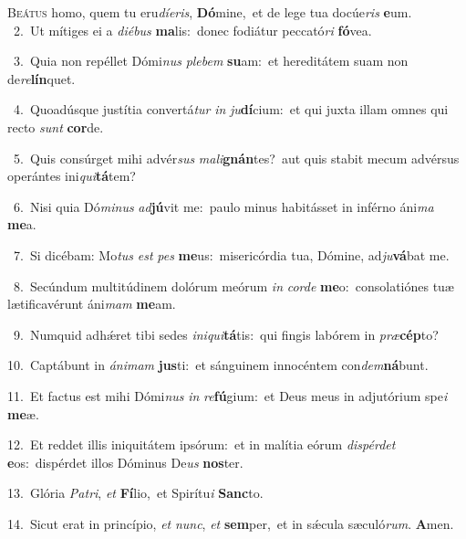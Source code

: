 \lettrine{\initial\textcolor{\initialcolor}{B}}{eátus} homo, quem tu eru\-\textit{dí}\-\textit{e}\textit{ris}, \textbf{Dó}\-mine,~\star et de lege tua docúe\textit{ris} \textbf{e}\-um.\\
{\numbfont\textcolor{\numbcolor}{~2.}}~Ut mítiges ei a \textit{di}\-\textit{é}\textit{bus} \textbf{ma}\-lis:~\star donec fodiátur peccató\textit{ri} \textbf{fó}\-vea.\par
{\numbfont\textcolor{\numbcolor}{~3.}}~Quia non repéllet Dómi\textit{nus} \textit{ple}\-\textit{bem} \textbf{su}\-am:~\star et hereditátem suam non de\-\textit{re}\-\textbf{lín}quet.\par
{\numbfont\textcolor{\numbcolor}{~4.}}~Quoadúsque justítia convertá\textit{tur} \textit{in} \textit{ju}\-\textbf{dí}cium:~\star et qui juxta illam omnes qui recto \textit{sunt} \textbf{cor}\-de.\par
{\numbfont\textcolor{\numbcolor}{~5.}}~Quis consúrget mihi advér\textit{sus} \textit{ma}\-\textit{li}\textbf{gnán}tes?~\star aut quis stabit mecum advérsus operántes ini\-\textit{qui}\-\textbf{tá}tem?\par
{\numbfont\textcolor{\numbcolor}{~6.}}~Nisi quia Dó\-\textit{mi}\-\textit{nus} \textit{ad}\-\textbf{jú}vit me:~\star paulo minus habitásset in inférno áni\textit{ma} \textbf{me}\-a.\par
{\numbfont\textcolor{\numbcolor}{~7.}}~Si dicébam: Mo\textit{tus} \textit{est} \textit{pes} \textbf{me}\-us:~\star misericórdia tua, Dómine, ad\-\textit{ju}\-\textbf{vá}bat me.\par
{\numbfont\textcolor{\numbcolor}{~8.}}~Secúndum multitúdinem dolórum meórum \textit{in} \textit{cor}\-\textit{de} \textbf{me}\-o:~\star consolatiónes tuæ lætificavérunt áni\textit{mam} \textbf{me}\-am.\par
{\numbfont\textcolor{\numbcolor}{~9.}}~Numquid adhǽret tibi sedes \textit{in}\-\textit{i}\textit{qui}\textbf{tá}tis:~\star qui fingis labórem in \textit{præ}\-\textbf{cép}to?\par
{\numbfont\textcolor{\numbcolor}{10.}}~Captábunt in \textit{á}\-\textit{ni}\textit{mam} \textbf{jus}\-ti:~\star et sánguinem innocéntem con\-\textit{dem}\-\textbf{ná}bunt.\par
{\numbfont\textcolor{\numbcolor}{11.}}~Et factus est mihi Dómi\textit{nus} \textit{in} \textit{re}\-\textbf{fú}gium:~\star et Deus meus in adjutórium spe\textit{i} \textbf{me}\-æ.\par
{\numbfont\textcolor{\numbcolor}{12.}}~Et reddet illis iniquitátem ipsórum:~\dagger et in malítia eórum \textit{dis}\-\textit{pér}\textit{det} \textbf{e}\-os:~\star dispérdet illos Dóminus De\textit{us} \textbf{nos}\-ter.\par
{\numbfont\textcolor{\numbcolor}{13.}}~Glória \textit{Pa}\-\textit{tri}, \textit{et} \textbf{Fí}\-lio,~\star et Spirítu\textit{i} \textbf{Sanc}\-to.\par
{\numbfont\textcolor{\numbcolor}{14.}}~Sicut erat in princípio, \textit{et} \textit{nunc}\-, \textit{et} \textbf{sem}\-per,~\star et in sǽcula sæculó\-\textit{rum}\-. \textbf{A}\-men.\par

